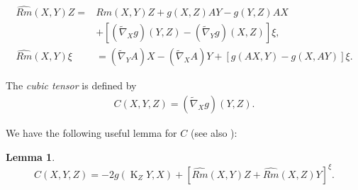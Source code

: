 \documentclass{amsart}
\newtheorem{lemma}[theorem]{Lemma}
\theoremstyle{definition}
\theoremstyle{remark}
\DeclareMathOperator{\diff}{K}
\numberwithin{equation}{section}
\begin{document}
\begin{align}
\label{eq:structure1}
\widehat{Rm} (X, Y) Z =& Rm(X, Y) Z + g(X, Z) A Y - g(Y, Z)A X \\
&+ \left[(\tilde{\nabla}_X g) (Y, Z) - (\tilde{\nabla}_Y g)( X, Z)\right] \xi \nonumber,\\
\label{eq:structure2}
\widehat{Rm} (X, Y) \xi &= (\tilde{\nabla}_Y A) X - (\tilde{\nabla}_X A) Y + \left[g(AX, Y) - g(X, AY)\right]\xi.
\end{align}

The \emph{cubic tensor} is defined by
\begin{align}
C(X,Y,Z) = (\tilde{\nabla}_X g) (Y,Z).
\end{align}

We have the following useful lemma for $C$ (see also \cite[Section II, Proposition 4.1]{MR1311248}):

\begin{lemma}
\label{lem:cubic_symmetry}
\[
C(X, Y, Z) =  -2g(\diff_Z Y, X) + \left[\widehat{Rm}(X, Y)Z + \widehat{Rm}(X, Z)Y\right]^{\xi}.
\]
\end{lemma}
\end{document}
